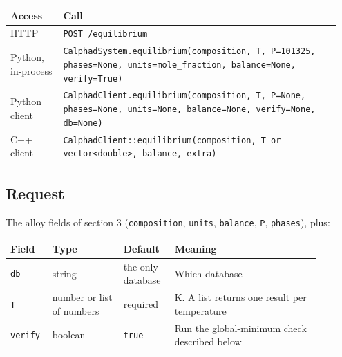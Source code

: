 \documentclass[12pt,a4paper]{article}
\begin{document}
\begingroup\small
\begin{longtable}{>{\raggedright\arraybackslash}p{0.155\linewidth}>{\raggedright\arraybackslash}p{0.792\linewidth}}
\toprule
\textbf{Access} & \textbf{Call} \\
\midrule
\endhead
HTTP & \texttt{POST /\allowbreak{}equilibrium} \\
Python, in-process & \texttt{CalphadSystem.\allowbreak{}equilibrium(composition,\allowbreak{} T,\allowbreak{} P=101325,\allowbreak{} phases=None,\allowbreak{} units=\textquotedbl{}mole\_\allowbreak{}fraction\textquotedbl{},\allowbreak{} balance=None,\allowbreak{} verify=True)} \\
Python client & \texttt{CalphadClient.\allowbreak{}equilibrium(composition,\allowbreak{} T,\allowbreak{} P=None,\allowbreak{} phases=None,\allowbreak{} units=None,\allowbreak{} balance=None,\allowbreak{} verify=None,\allowbreak{} db=None)} \\
C++ client & \texttt{CalphadClient::equilibrium(composition,\allowbreak{} T or vector\textless{}double\textgreater{},\allowbreak{} balance,\allowbreak{} extra)} \\
\bottomrule
\end{longtable}
\endgroup

\subsection*{Request}
The alloy fields of section 3 (\texttt{composition}, \texttt{units}, \texttt{balance}, \texttt{P}, \texttt{phases}), plus:

\begingroup\small
\begin{longtable}{>{\raggedright\arraybackslash}p{0.094\linewidth}>{\raggedright\arraybackslash}p{0.211\linewidth}>{\raggedright\arraybackslash}p{0.156\linewidth}>{\raggedright\arraybackslash}p{0.432\linewidth}}
\toprule
\textbf{Field} & \textbf{Type} & \textbf{Default} & \textbf{Meaning} \\
\midrule
\endhead
\texttt{db} & string & the only database & Which database \\
\texttt{T} & number or list of numbers & required & K. A list returns one result per temperature \\
\texttt{verify} & boolean & \texttt{true} & Run the global-minimum check described below \\
\bottomrule
\end{longtable}
\endgroup
\end{document}
